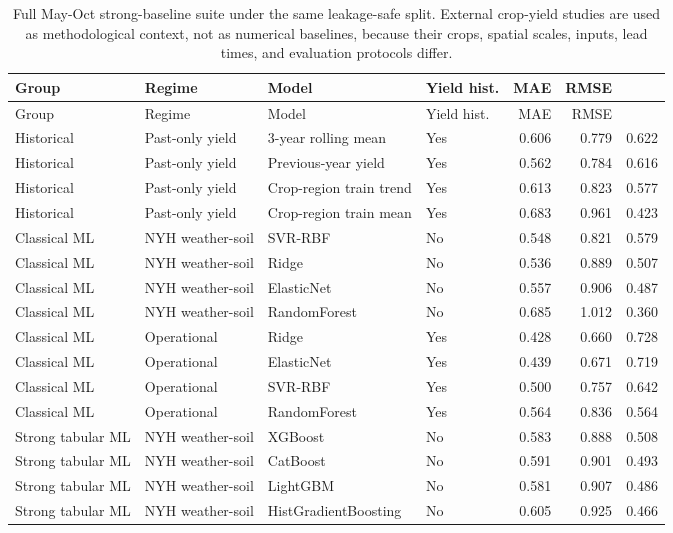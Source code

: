 \tiny
\begin{longtable}{@{}p{}p{}p{}p{}rrr@{}}
\caption{Full May-Oct strong-baseline suite under the same leakage-safe split. External crop-yield studies are used as methodological context, not as numerical baselines, because their crops, spatial scales, inputs, lead times, and evaluation protocols differ.}\label{tab:baselines-full-appendix}\\
\toprule
Group & Regime & Model & Yield hist. & MAE & RMSE & \Rsq{} \\
\midrule
\endfirsthead
\toprule
Group & Regime & Model & Yield hist. & MAE & RMSE & \Rsq{} \\
\midrule
\endhead
Historical & Past-only yield & 3-year rolling mean & Yes & 0.606 & 0.779 & 0.622 \\
Historical & Past-only yield & Previous-year yield & Yes & 0.562 & 0.784 & 0.616 \\
Historical & Past-only yield & Crop-region train trend & Yes & 0.613 & 0.823 & 0.577 \\
Historical & Past-only yield & Crop-region train mean & Yes & 0.683 & 0.961 & 0.423 \\
Classical ML & NYH weather-soil & SVR-RBF & No & 0.548 & 0.821 & 0.579 \\
Classical ML & NYH weather-soil & Ridge & No & 0.536 & 0.889 & 0.507 \\
Classical ML & NYH weather-soil & ElasticNet & No & 0.557 & 0.906 & 0.487 \\
Classical ML & NYH weather-soil & RandomForest & No & 0.685 & 1.012 & 0.360 \\
Classical ML & Operational & Ridge & Yes & 0.428 & 0.660 & 0.728 \\
Classical ML & Operational & ElasticNet & Yes & 0.439 & 0.671 & 0.719 \\
Classical ML & Operational & SVR-RBF & Yes & 0.500 & 0.757 & 0.642 \\
Classical ML & Operational & RandomForest & Yes & 0.564 & 0.836 & 0.564 \\
Strong tabular ML & NYH weather-soil & XGBoost & No & 0.583 & 0.888 & 0.508 \\
Strong tabular ML & NYH weather-soil & CatBoost & No & 0.591 & 0.901 & 0.493 \\
Strong tabular ML & NYH weather-soil & LightGBM & No & 0.581 & 0.907 & 0.486 \\
Strong tabular ML & NYH weather-soil & HistGradientBoosting & No & 0.605 & 0.925 & 0.466 \\

\end{longtable}
